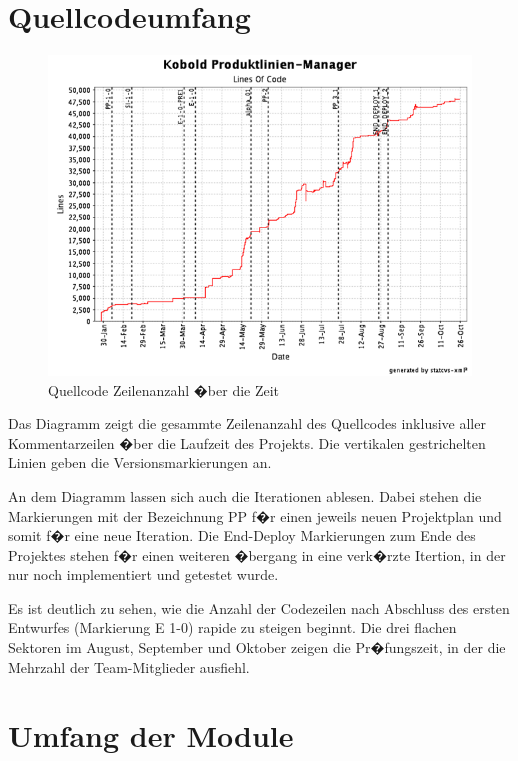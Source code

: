 \documentclass[a4paper,titlepage,12pt,ngerman]{scrbook}
\begin{document}
\section{Quellcodeumfang}

\begin{figure}[h!]
  \centering
  \includegraphics[width=15cm]{praesentation/lines_of_code}
  \caption{Quellcode Zeilenanzahl �ber die Zeit}
\end{figure}

Das Diagramm zeigt die gesammte Zeilenanzahl des Quellcodes inklusive
aller Kommentarzeilen �ber die Laufzeit des Projekts. Die vertikalen
gestrichelten Linien geben die Versionsmarkierungen an.\par

An dem Diagramm lassen sich auch die Iterationen ablesen. Dabei stehen die 
Markierungen mit der Bezeichnung PP f�r einen jeweils neuen Projektplan und
somit f�r eine neue Iteration. Die End-Deploy Markierungen zum Ende des Projektes
stehen f�r einen weiteren �bergang in eine verk�rzte Itertion, in der nur noch
implementiert und getestet wurde.\par

Es ist deutlich zu sehen, wie die Anzahl der Codezeilen nach Abschluss des ersten
Entwurfes (Markierung E 1-0) rapide zu steigen beginnt. Die drei flachen Sektoren im August, September und Oktober zeigen die
Pr�fungszeit, in der die Mehrzahl der Team-Mitglieder ausfiehl. 


\section{Umfang der Module}
\end{document}
